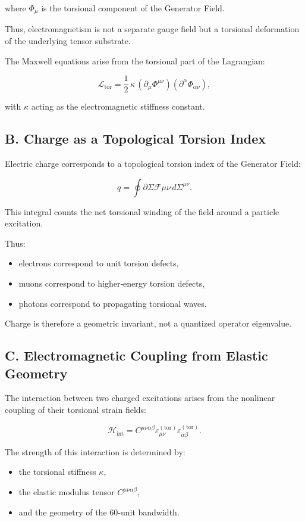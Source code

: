 \documentclass[reprint,amsmath,amssymb,aps,prl,floatfix]{revtex4-2}
\begin{document}
where \(\Phi_\mu\) is the torsional component of the Generator Field.

Thus, electromagnetism is not a separate gauge field but a torsional deformation of the underlying tensor substrate.
\medskip

The Maxwell equations arise from the torsional part of the Lagrangian:

\[
\mathcal{L}_{\mathrm{tor}}
=
\frac{1}{2}\,\kappa\,
(\partial_\mu \Phi^{\mu\nu})
(\partial^\alpha \Phi_{\alpha\nu}),
\]

with \(\kappa\) acting as the electromagnetic stiffness constant.

\subsection{B. Charge as a Topological Torsion Index}

Electric charge corresponds to a topological torsion index of the Generator Field:

\[
q = \oint{\partial\Sigma} \mathcal{F}{\mu\nu}\,d\Sigma^{\mu\nu}.
\]

This integral counts the net torsional winding of the field around a particle excitation.
\medskip

Thus:
\begin{itemize}
      \item electrons correspond to unit torsion defects,  
      \item muons correspond to higher‑energy torsion defects,  
      \item photons correspond to propagating torsional waves.
\end{itemize}

Charge is therefore a geometric invariant, not a quantized operator eigenvalue.

\subsection{C. Electromagnetic Coupling from Elastic Geometry}

The interaction between two charged excitations arises from the nonlinear coupling of their torsional strain fields:

\[
\mathcal{H}_{\mathrm{int}}
=
C^{\mu\nu\alpha\beta}
\varepsilon_{\mu\nu}^{(\mathrm{tor})}
\varepsilon_{\alpha\beta}^{(\mathrm{tor})}.
\]

The strength of this interaction is determined by:
\begin{itemize}
      \item the torsional stiffness \(\kappa\),  
      \item the elastic modulus tensor \(C^{\mu\nu\alpha\beta}\),  
      \item and the geometry of the 60‑unit bandwidth.
\end{itemize}
\end{document}
